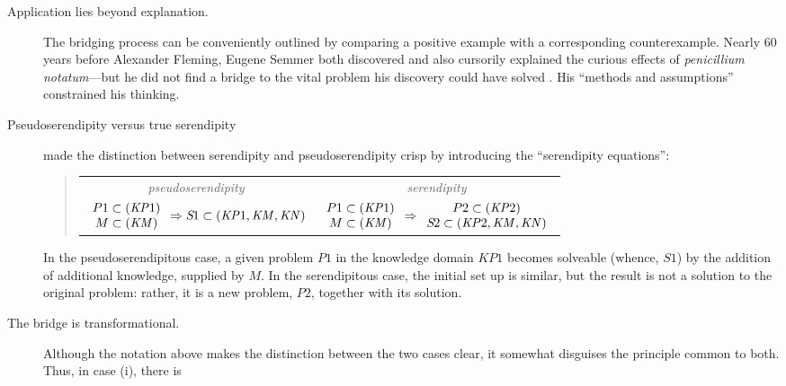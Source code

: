 \begin{description}
\item[Application lies beyond explanation.]
  The bridging process can be
  conveniently outlined by comparing a positive example with a
  corresponding counterexample.  Nearly 60 years before Alexander Fleming,
  Eugene Semmer both discovered and also cursorily explained the
  curious effects of \emph{penicillium notatum}---but he did not find
  a bridge to the vital problem his discovery could have solved
  \cite[p.~75]{cropley2013creativity}.  His ``methods and
  assumptions'' \cite[p.~131]{floppyearedrabbits1958barber}
  constrained his thinking.
\item[Pseudoserendipity versus true serendipity]
  \citet[p.~3]{Figueiredo2001} made the distinction between
  serendipity and pseudoserendipity  crisp by introducing
  the ``serendipity equations'':
\begin{quote}
\begin{tabular}{cc}
\emph{pseudoserendipity} & \emph{serendipity}\\
$\begin{array}{c}
P1 \subset (\mathit{KP}1)\\
M \subset (\mathit{KM})
\end{array} \Rightarrow S\hspace{-.12em}1 \subset (\mathit{KP}1, \mathit{KM}, \mathit{KN})$
&
$\begin{array}{c}
P1 \subset (\mathit{KP}1)\\
M \subset (\mathit{KM})
\end{array} \Rightarrow
\begin{array}{c}
P2 \subset (\mathit{KP}2)\\
S\hspace{-.1em}2 \subset (\mathit{KP}2, \mathit{KM}, \mathit{KN})
\end{array}$
\end{tabular}
\end{quote}
In the pseudoserendipitous case, a given problem $P1$ in the knowledge
domain $\mathit{KP}1$ becomes solveable (whence, $S1$) by the addition of
additional knowledge, supplied by $M$.  In the serendipitous case, the
initial set up is similar, but the result is not a solution to the
original problem: rather, it is a new problem, $P2$, together with its
solution.
\item[The bridge is transformational.]  Although the notation above
  makes the distinction between the two cases clear, it somewhat
  disguises the principle common to both.  Thus, in case (i), there is

\end{description}
